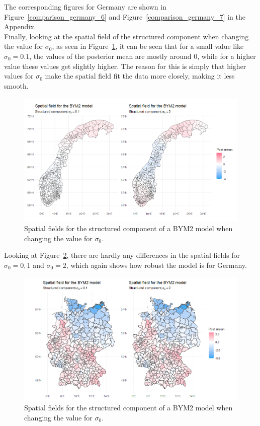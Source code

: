 The corresponding figures for Germany are shown in Figure~\ref{comparison_germany_6} and Figure~\ref{comparison_germany_7} in the Appendix. \\
Finally, looking at the spatial field of the structured component when changing the value for $\sigma_0$, as seen in Figure~\ref{comparison_norway_8}, it can be seen that for a small value like $\sigma_0 = 0.1$, the values of the posterior mean are mostly around 0, while for a higher value these values get slightly higher. The reason for this is simply that higher values for $\sigma_0$ make the spatial field fit the data more closely, making it less smooth.
\begin{figure}[H]
  \centering
  \includegraphics[width = \textwidth]{spatial_field_norway_3.png}
  \caption{Spatial fields for the structured component of a BYM2 model when changing the value for $\sigma_0$.}
  \label{comparison_norway_8}
\end{figure}
Looking at Figure~\ref{comparison_germany_8}, there are hardly any differences in the spatial fields for $\sigma_0=0,1$ and $\sigma_0=2$, which again shows how robust the model is for Germany.
\begin{figure}[H]
    \centering
    \includegraphics[width = \textwidth]{spatial_field_germany_3.png}
    \caption{Spatial fields for the structured component of a BYM2 model when changing the value for $\sigma_0$.}
    \label{comparison_germany_8}
\end{figure}

